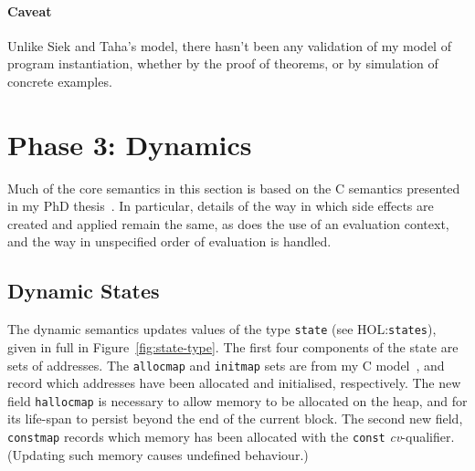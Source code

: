 \documentclass[11pt]{article}
\newcommand{\HOLfile}[1]{HOL:\texttt{#1}}
\begin{document}
\paragraph{Caveat} Unlike Siek and Taha's model, there hasn't been any
validation of my model of program instantiation, whether by the proof
of theorems, or by simulation of concrete examples.





\section{Phase 3: Dynamics}
\label{sec:phase3}

Much of the core semantics in this section is based on the C semantics
presented in my PhD thesis~\cite{Norrish98}.  In particular, details
of the way in which side effects are created and applied remain the
same, as does the use of an evaluation context, and the way in
unspecified order of evaluation is handled.

\subsection{Dynamic States}
\label{sec:dynamic-states}

The dynamic semantics updates values of the type \texttt{state} (see
\HOLfile{states}), given in full in Figure~\ref{fig:state-type}.  The
first four components of the state are sets of addresses.  The
\texttt{allocmap} and \texttt{initmap} sets are from my C
model~\cite{Norrish98}, and record which addresses have been allocated
and initialised, respectively.  The new field \texttt{hallocmap} is
necessary to allow memory to be allocated on the heap, and for its
life-span to persist beyond the end of the current block.  The second
new field, \texttt{constmap} records which memory has been allocated
with the \texttt{const} \emph{cv}-qualifier.  (Updating such memory
causes undefined behaviour.)
\end{document}

